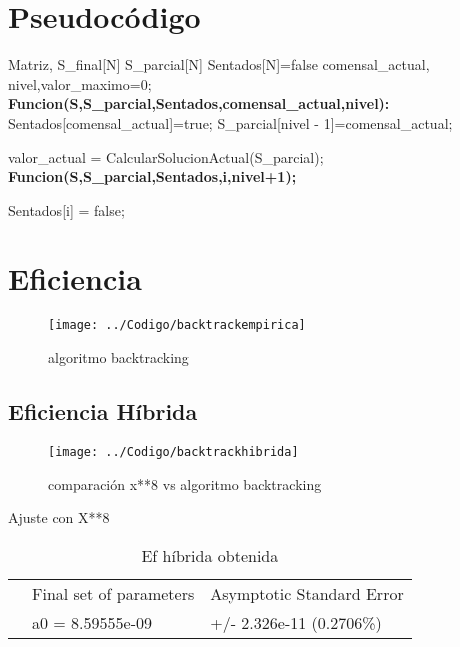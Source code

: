 
\section{Pseudocódigo}

\begin{algorithmic}				
	\Require Matriz, S\_final[N] S\_parcial[N] Sentados[N]={false} comensal\_actual, nivel,valor\_maximo=0;
	\State \textbf{Funcion(S,S\_parcial,Sentados,comensal\_actual,nivel):}
	\State Sentados[comensal\_actual]=true;
	\State	   S\_parcial[nivel - 1]=comensal\_actual;
	
	\State 	valor\_actual = CalcularSolucionActual(S\_parcial);
	\State 	\textbf{Funcion(S,S\_parcial,Sentados,i,nivel+1);}
	\EndIf
	\EndIf
	
	\State Sentados[i] = false;
	\EndIf
	\EndFor
	
	
\end{algorithmic}	


\section{Eficiencia}




	
	\begin{figure}[H]
		\centering
		\texttt{[image: ../Codigo/backtrackempirica]}
		\caption{algoritmo backtracking}
		\label{fig:backtrackhibrida}
	\end{figure}
	
	

\subsection{Eficiencia Híbrida}	
	
	\begin{figure}[H]
		\centering
		\texttt{[image: ../Codigo/backtrackhibrida]}
		\caption{comparación x**8 vs algoritmo backtracking}
		\label{fig:backtrackhibrida}
	\end{figure}
	

	Ajuste con X**8
	
	\begin{table}[H]
		\centering
		\caption{Ef híbrida obtenida}
		\label{my-label}
		\begin{tabular}{lll}
			& Final set of parameters &   Asymptotic Standard Error & \\
			& a0  = 8.59555e-09 &  +/- 2.326e-11    (0.2706\%)&  \\
			
		\end{tabular}
	\end{table}
	




